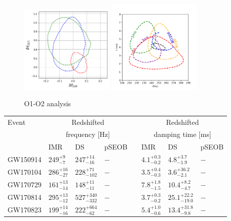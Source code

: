 \documentclass[twocolumn,prd,superscriptaddress,amsfonts,amssymb,amsmath,preprintnumbers]{revtex4-1}
\begin{document}
\begin{figure}[H]
	\includegraphics[width=0.4\textwidth]{figures/O1O2_realevents.png}
	\includegraphics[width=0.4\textwidth]{figures/GW150914.png}
	\caption{O1-O2 analysis}\label{fig:o1o2_events}
\end{figure}

\begin{tabular}{llllllll}
\toprule
Event & \multicolumn{3}{c}{Redshifted} & \hphantom{X} & \multicolumn{3}{c}{Redshifted} \\
& \multicolumn{3}{c}{frequency [Hz]} & \hphantom{X} & \multicolumn{3}{c}{damping time [ms]} \\[0.075cm]
\cline{2-4}
\cline{6-8}
& IMR & DS & pSEOB & \hphantom{X} & IMR & DS & pSEOB \\
\midrule

GW150914 &
$249^{+9}_{-7}$ &
$247^{+14}_{-16}$ &
$-$ &
\hphantom{X} &
$4.1^{+0.3}_{-0.2}$ &
$4.8^{+3.7}_{-1.9}$ &
$-$
\\[0.075cm]

GW170104 &
$286^{+16}_{-27}$ &
$228^{+71}_{-102}$ &
$-$ &
\hphantom{X} &
$3.5^{+0.4}_{-0.3}$ &
$3.6^{+36.2}_{-2.1}$ &
$-$
\\[0.075cm]

GW170729 &
$161^{+13}_{-14}$ &
$148^{+11}_{-11}$ &
$-$ &
\hphantom{X} &
$7.8^{+1.8}_{-1.5}$ &
$10.4^{+8.2}_{-4.7}$ &
$-$
\\[0.075cm]

GW170814 &
$295^{+13}_{-12}$ &
$527^{+340}_{-332}$ &
$-$ &
\hphantom{X} &
$3.7^{+0.3}_{-0.2}$ &
$25.1^{+22.2}_{-19.0}$ &
$-$
\\[0.075cm]

GW170823 &
$199^{+14}_{-16}$ &
$222^{+664}_{-62}$ &
$-$ &
\hphantom{X} &
$5.4^{+1.0}_{-0.6}$ &
$13.4^{+31.8}_{-9.8}$ &
$-$
\\[0.075cm]

\bottomrule
\end{tabular}\label{tab:qnm_o1o2_results}
\end{document}
